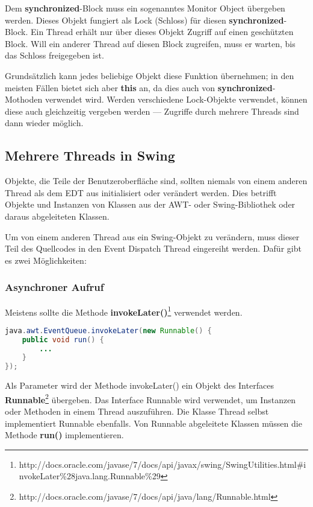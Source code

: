 Dem \textbf{synchronized}-Block muss ein sogenanntes \glqq{}Monitor Object\grqq{} übergeben werden. Dieses Objekt fungiert als \glqq{}Lock\grqq{} (Schloss) für diesen \textbf{synchronized}-Block. Ein Thread erhält nur über dieses Objekt Zugriff auf einen geschützten Block. Will ein anderer Thread auf diesen Block zugreifen, muss er warten, bis das \glqq{}Schloss\grqq{} freigegeben ist.

Grundsätzlich kann jedes beliebige Objekt diese Funktion übernehmen; in den meisten Fällen bietet sich aber \textbf{this} an, da dies auch von \textbf{synchronized}-Mothoden verwendet wird. Werden verschiedene Lock-Objekte verwendet, können diese auch gleichzeitig vergeben werden --- Zugriffe durch mehrere Threads sind dann wieder möglich.

\subsection{Mehrere Threads in Swing}

Objekte, die Teile der Benutzeroberfläche sind, sollten niemals von einem anderen Thread  als dem EDT aus initialisiert oder verändert werden. Dies betrifft Objekte und Instanzen von Klassen aus der AWT- oder Swing-Bibliothek oder daraus abgeleiteten Klassen.%

Um von einem anderen Thread aus ein Swing-Objekt zu verändern, muss dieser Teil des Quellcodes in den Event Dispatch Thread eingereiht werden. Dafür gibt es zwei Möglichkeiten:

\subsubsection*{Asynchroner Aufruf}
Meistens sollte die Methode \textbf{invokeLater()}\footnote{http://docs.oracle.com/javase/7/docs/api/javax/swing/SwingUtilities.html\#invokeLater\%28java.lang.Runnable\%29} verwendet werden.
\begin{lstlisting}[language=JAVA]
java.awt.EventQueue.invokeLater(new Runnable() {
	public void run() {
		...
	}
});
\end{lstlisting}
	Als Parameter wird der Methode invokeLater() ein Objekt des Interfaces \textbf{Runnable}\footnote{http://docs.oracle.com/javase/7/docs/api/java/lang/Runnable.html} übergeben. Das Interface Runnable wird verwendet, um Instanzen oder Methoden in einem Thread auszuführen. Die Klasse Thread selbst implementiert Runnable ebenfalls. Von Runnable abgeleitete Klassen müssen die Methode \textbf{run()} implementieren.
	
